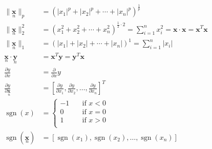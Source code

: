 \newcommand{\matrix}[1]{\mathbf{#1}}
\newcommand{\vector}[1]{\mathbf{#1}}
\DeclareMathOperator{\sgn}{sgn}
\begin{align*}
\|\underset{n}{\vector{x}}\|_p &= \left( |x_1|^p + |x_2|^p + \cdots + |x_n|^p \right)^\frac{1}{p} \\
\|\underset{n}{\vector{x}}\|_2^2 &= \left( x_1^2 + x_2^2 + \cdots + x_n^2 \right)^{\frac{1}{2} \cdot 2} = \sum_{i=1}^{n}{x_i^2} = \vector{x} \cdot \vector{x} = \vector{x}^T\vector{x} \\
\|\underset{n}{\vector{x}}\|_1 &= \left( |x_1| + |x_2| + \cdots + |x_n| \right)^1 = \sum_{i=1}^{n}{|x_i|} \\
\underset{n}{\vector{x}} \cdot \underset{n}{\vector{y}} &= \vector{x}^T\vector{y} = \vector{y}^T\vector{x} \\
\frac{\partial y}{\partial x} &= \frac{\partial}{\partial x}y \\
\frac{\partial y}{\partial \underset{n}{\vector{x}}} &= \left[ \frac{\partial y}{\partial x_1}, \frac{\partial y}{\partial x_2}, \ldots, \frac{\partial y}{\partial x_n} \right]^T \\
\sgn(x) &=
\begin{cases}
    -1 & \quad \text{if } x < 0 \\
     0 & \quad \text{if } x = 0 \\
     1 & \quad \text{if } x > 0 \\
\end{cases} \\
\sgn(\underset{n}{\vector{x}}) &= \left[ \sgn(x_1), \sgn(x_2), \ldots, \sgn(x_n) \right] \\
\end{align*}
